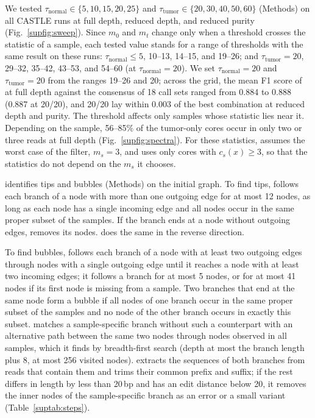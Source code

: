 We tested $\tau_{\mathrm{normal}}\in\{5,10,15,20,25\}$ and $\tau_{\mathrm{tumor}}\in\{20,30,40,50,60\}$ (Methods) on all CASTLE runs at full depth, reduced depth, and reduced purity (Fig.~\ref{supfig:sweep}).
Since $m_0$ and $m_t$ change only when a threshold crosses the statistic of a sample, each tested value stands for a range of thresholds with the same result on these runs: $\tau_{\mathrm{normal}}\leq 5$, 10--13, 14--15, and 19--26; and $\tau_{\mathrm{tumor}}=20$, 29--32, 35--42, 43--53, and 54--60 (at $\tau_{\mathrm{normal}}=20$).
We set $\tau_{\mathrm{normal}}=20$ and $\tau_{\mathrm{tumor}}=20$ from the ranges 19--26 and 20; across the grid, the mean F1 score of \tool{} at full depth against the consensus of 18 call sets ranged from 0.884 to 0.888 (0.887 at 20/20), and 20/20 lay within 0.003 of the best combination at reduced depth and purity.
The threshold affects only samples whose statistic lies near it.
Depending on the sample, 56--85\% of the tumor-only cores occur in only two or three reads at full depth (Fig.~\ref{supfig:spectra}).
For these statistics, \tool{} assumes the worst case of the filter, $m_s=3$, and uses only cores with $c_s(x)\geq 3$, so that the statistics do not depend on the $m_s$ it chooses.


\tool{} identifies tips and bubbles (Methods) on the initial graph.
To find tips, \tool{} follows each branch of a node with more than one outgoing edge for at most 12 nodes, as long as each node has a single incoming edge and all nodes occur in the same proper subset of the samples.
If the branch ends at a node without outgoing edges, \tool{} removes its nodes.
\tool{} does the same in the reverse direction.

To find bubbles, \tool{} follows each branch of a node with at least two outgoing edges through nodes with a single outgoing edge until it reaches a node with at least two incoming edges; it follows a branch for at most 5 nodes, or for at most 41 nodes if its first node is missing from a sample.
Two branches that end at the same node form a bubble if all nodes of one branch occur in the same proper subset of the samples and no node of the other branch occurs in exactly this subset.
\tool{} matches a sample-specific branch without such a counterpart with an alternative path between the same two nodes through nodes observed in all samples, which it finds by breadth-first search (depth at most the branch length plus 8, at most 256 visited nodes).
\tool{} extracts the sequences of both branches from reads that contain them and trims their common prefix and suffix; if the rest differs in length by less than 20\,bp and has an edit distance below 20, it removes the inner nodes of the sample-specific branch as an error or a small variant (Table~\ref{suptab:steps}).


